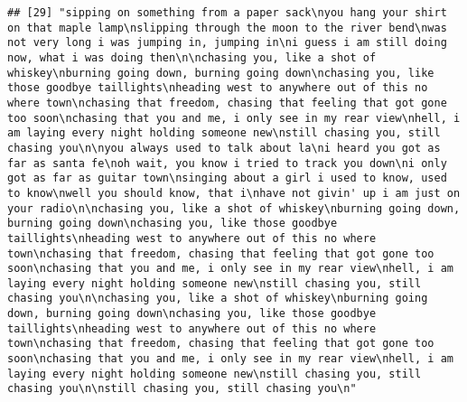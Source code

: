 \documentclass[]{article}
\begin{document}
\begin{verbatim}
## [29] "sipping on something from a paper sack\nyou hang your shirt on that maple lamp\nslipping through the moon to the river bend\nwas not very long i was jumping in, jumping in\ni guess i am still doing now, what i was doing then\n\nchasing you, like a shot of whiskey\nburning going down, burning going down\nchasing you, like those goodbye taillights\nheading west to anywhere out of this no where town\nchasing that freedom, chasing that feeling that got gone too soon\nchasing that you and me, i only see in my rear view\nhell, i am laying every night holding someone new\nstill chasing you, still chasing you\n\nyou always used to talk about la\ni heard you got as far as santa fe\noh wait, you know i tried to track you down\ni only got as far as guitar town\nsinging about a girl i used to know, used to know\nwell you should know, that i\nhave not givin' up i am just on your radio\n\nchasing you, like a shot of whiskey\nburning going down, burning going down\nchasing you, like those goodbye taillights\nheading west to anywhere out of this no where town\nchasing that freedom, chasing that feeling that got gone too soon\nchasing that you and me, i only see in my rear view\nhell, i am laying every night holding someone new\nstill chasing you, still chasing you\n\nchasing you, like a shot of whiskey\nburning going down, burning going down\nchasing you, like those goodbye taillights\nheading west to anywhere out of this no where town\nchasing that freedom, chasing that feeling that got gone too soon\nchasing that you and me, i only see in my rear view\nhell, i am laying every night holding someone new\nstill chasing you, still chasing you\n\nstill chasing you, still chasing you\n"                                                                                                                                                                                                                                                                                                                                                                                                                                                                                                                                                                                                                                                                                                                                                                                                                                                                                                                                                                                                                                                                                                                                                                                                                   

\end{verbatim}
\end{document}
